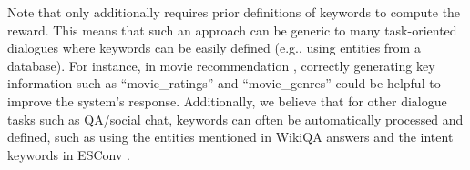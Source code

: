 Note that  only additionally requires prior definitions of keywords to compute the reward. This means that such an approach can be generic to many task-oriented dialogues where keywords can be easily defined (e.g., using entities from a database). For instance, in movie recommendation \cite{movielens}, correctly generating key information such as ``movie\_ratings'' and ``movie\_genres'' could be helpful to improve the system's response. Additionally, we believe that for other dialogue tasks such as QA/social chat, keywords can often be automatically processed and defined, such as using the entities mentioned in WikiQA answers \cite{yang-etal-2015-wikiqa} and the intent keywords in ESConv \cite{liu2021emotional}.
\begin{table*}[!t]
  \centering
\end{table*}
